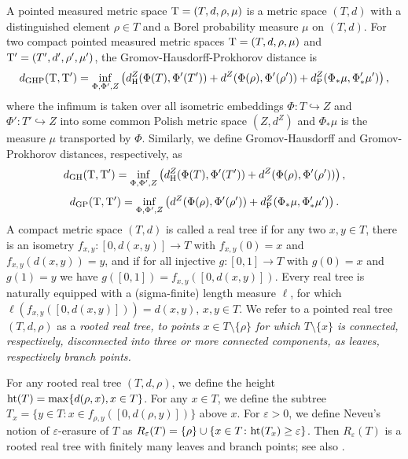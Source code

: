 \documentclass[11pt,a4paper]{article}
\begin{document}
A pointed measured  metric space ${\rm T} = (T, d,  \rho,\mu)$ is a
metric space $(T, d)$ with a distinguished element $\rho\in T$
and  a Borel probability measure  $\mu$ on $(T,d)$.
For two compact pointed measured metric spaces ${\rm T}=(T,d,\rho,\mu)$ and ${\rm T}'=(T',d',\rho',\mu')$, the Gromov-Hausdorff-Prokhorov  distance is\vspace{-0.2cm}
$$%
 d_{\text{GHP}}({\rm T},{\rm T}') = \inf_{\Phi,\Phi',Z} \left(
 d_\text{H}^Z(\Phi(T),\Phi'(T')) +
d^Z(\Phi(\rho),\Phi'(\rho')) + d_\text{P}^Z(\Phi_* \mu,\Phi_*'
\mu') \right),\vspace{-0.1cm}
$$%
where the infimum is taken over all isometric embeddings $\Phi\colon T\hookrightarrow
Z$ and $\Phi'\colon T'\hookrightarrow Z$ into some common Polish metric space
$(Z,d^Z)$ and $\Phi_* \mu$ is the measure $\mu$ transported by $\Phi$.
Similarly, we define Gromov-Hausdorff and Gromov-Prokhorov distances, respectively, as
$$%
 d_{\text{GH}}({\rm T},{\rm T}') = \inf_{\Phi,\Phi',Z} \left(
 d_\text{H}^Z(\Phi(T),\Phi'(T')) +
d^Z(\Phi(\rho),\Phi'(\rho'))  \right),
$$
$$%
 d_{\text{GP}}({\rm T},{\rm T}') = \inf_{\Phi,\Phi',Z} \left(
d^Z(\Phi(\rho),\Phi'(\rho')) + d_\text{P}^Z(\Phi_* \mu,\Phi_*'
\mu') \right).
$$
A compact metric space $(T,d)$ is called a real tree if for any two $x,y\in T$, there is an isometry $f_{x,y}\colon[0,d(x,y)]\rightarrow T$ with $f_{x,y}(0)=x$ and 
$f_{x,y}(d(x,y))=y$, and if for all injective $g\colon[0,1]\rightarrow T$ with $g(0)=x$ and $g(1)=y$ we have $g([0,1])=f_{x,y}([0,d(x,y)])$. Every real tree is naturally
equipped with a (sigma-finite) length measure $\ell$, for which $\ell(f_{x,y}([0,d(x,y)]))=d(x,y)$, $x,y\in T$. We refer to a pointed real tree $(T,d,\rho)$ as a \em rooted \em real tree, to points $x\in T\setminus\{\rho\}$ for which $T\setminus\{x\}$ is connected, respectively, disconnected into three or more connected components, 
as \em leaves\em, respectively \em branch points\em.

For any rooted real tree $(T,d,\rho)$, we define the height ${\rm ht}(T)=\max\{d(\rho,x),x\in T\}$. For any $x\in T$, we define the subtree 
$T_x=\{y\in T\colon x\in f_{\rho,y}([0,d(\rho,y)])\}$ above $x$. For $\varepsilon>0$, we define Neveu's \cite{Nev86b} notion of $\varepsilon$-erasure of $T$ as $R_\varepsilon(T)=\{\rho\}\cup\{x\in T\colon{\rm ht}(T_x)\ge\varepsilon\}$. Then $R_\varepsilon(T)$ is a rooted real tree with finitely many leaves and branch points; see also \cite{EPW06,NeP89b,NeP89a}. 
\end{document}
